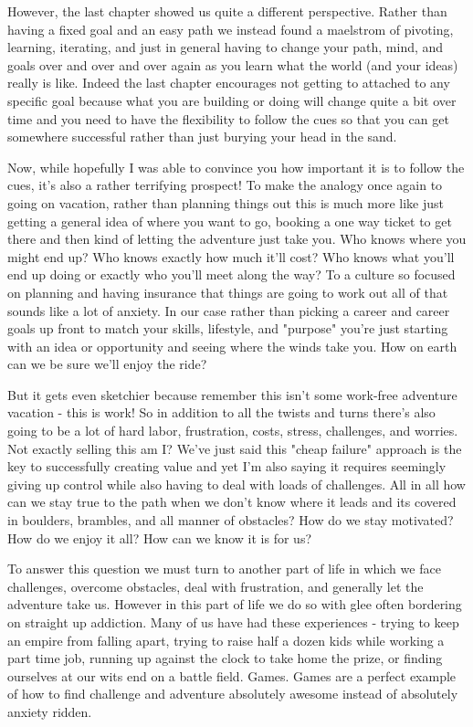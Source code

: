 \documentclass[11pt,a5paper]{book}
\begin{document}
However, the last chapter showed us quite a different perspective. Rather than having a fixed goal and an easy path we instead found a maelstrom of pivoting, learning, iterating, and just in general having to change your path, mind, and goals over and over and over again as you learn what the world (and your ideas) really is like. Indeed the last chapter encourages not getting to attached to any specific goal because what you are building or doing will change quite a bit over time and you need to have the flexibility to follow the cues so that you can get somewhere successful rather than just burying your head in the sand. 
\newline

Now, while hopefully I was able to convince you how important it is to follow the cues, it's also a rather terrifying prospect! To make the analogy once again to going on vacation, rather than planning things out this is much more like just getting a general idea of where you want to go, booking a one way ticket to get there and then kind of letting the adventure just take you. Who knows where you might end up? Who knows exactly how much it'll cost? Who knows what you'll end up doing or exactly who you'll meet along the way? To a culture so focused on planning and having insurance that things are going to work out all of that sounds like a lot of anxiety. In our case rather than picking a career and career goals up front to match your skills, lifestyle, and "purpose" you're just starting with an idea or opportunity and seeing where the winds take you. How on earth can we be sure we'll enjoy the ride?
\newline

But it gets even sketchier because remember this isn't some work-free adventure vacation - this is work! So in addition to all the twists and turns there's also going to be a lot of hard labor, frustration, costs, stress, challenges, and worries. Not exactly selling this am I? We've just said this "cheap failure" approach is the key to successfully creating value and yet I'm also saying it requires seemingly giving up control while also having to deal with loads of challenges. All in all how can we stay true to the path when we don't know where it leads and its covered in boulders, brambles, and all manner of obstacles? How do we stay motivated? How do we enjoy it all? How can we know it is for us?
\newline

To answer this question we must turn to another part of life in which we face challenges, overcome obstacles, deal with frustration, and generally let the adventure take us. However in this part of life we do so with glee often bordering on straight up addiction. Many of us have had these experiences - trying to keep an empire from falling apart, trying to raise half a dozen kids while working a part time job, running up against the clock to take home the prize, or finding ourselves at our wits end on a battle field. Games. Games are a perfect example of how to find challenge and adventure absolutely awesome instead of absolutely anxiety ridden. 
\newline
\end{document}
